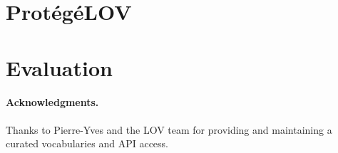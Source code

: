 \documentclass[runningheads,a4paper]{llncs}
\begin{document}

\section{Prot{\'e}g{\'e}LOV}\label{sec:classification}




\section{Evaluation}\label{sec:evaluation}





\paragraph{\textbf{Acknowledgments.}} %
Thanks to Pierre-Yves and the LOV team for providing and maintaining a curated vocabularies and API access.


\nocite{*}

\end{document}
